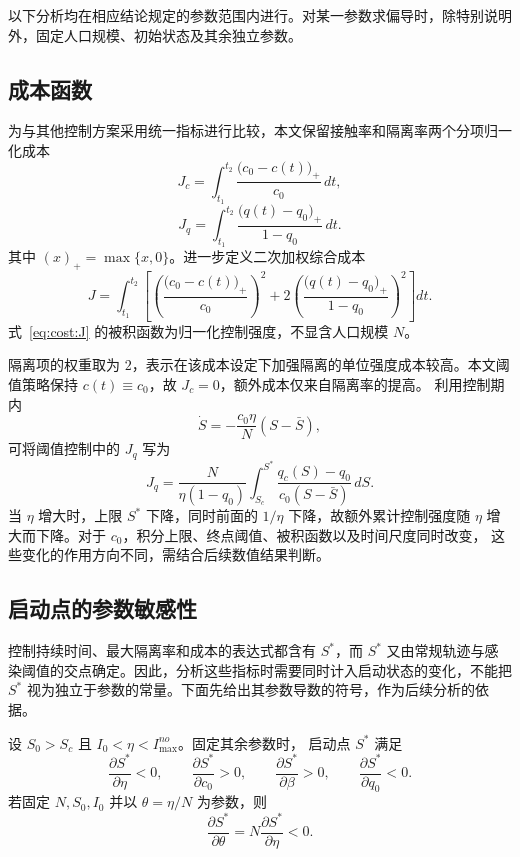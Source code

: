 \documentclass[lang=cn,a4paper,newtx]{elegantpaper}
\numberwithin{equation}{section}
\theoremstyle{plain}
\begin{document}
以下分析均在相应结论规定的参数范围内进行。对某一参数求偏导时，除特别说明外，固定人口规模、初始状态及其余独立参数。

\subsection{成本函数}

为与其他控制方案采用统一指标进行比较，本文保留接触率和隔离率两个分项归一化成本
\begin{equation}
J_c=\int_{t_1}^{t_2} \frac{\bigl(c_0-c(t)\bigr)_+}{c_0}\,dt,
\end{equation}
\begin{equation}
J_q=\int_{t_1}^{t_2} \frac{\bigl(q(t)-q_0\bigr)_+}{1-q_0}\,dt.
\end{equation}
其中 $(x)_+=\max\{x,0\}$。进一步定义二次加权综合成本
\begin{equation}
J
=
\int_{t_1}^{t_2}
\left[
\left(\frac{\bigl(c_0-c(t)\bigr)_+}{c_0}\right)^2
+
2\left(\frac{\bigl(q(t)-q_0\bigr)_+}{1-q_0}\right)^2
\right]dt.
\label{eq:cost:J}
\end{equation}
式~\eqref{eq:cost:J} 的被积函数为归一化控制强度，不显含人口规模 $N$。

隔离项的权重取为 $2$，表示在该成本设定下加强隔离的单位强度成本较高。本文阈值策略保持 $c(t)\equiv c_0$，故 $J_c=0$，额外成本仅来自隔离率的提高。
利用控制期内
\[
\dot S=-\frac{c_0\eta}{N}(S-\bar S),
\]
可将阈值控制中的 $J_q$ 写为
\begin{equation}
J_q
=
\frac{N}{\eta(1-q_0)}
\int_{S_c}^{S^*}
\frac{q_c(S)-q_0}{c_0(S-\bar S)}\,dS.
\end{equation}
当 $\eta$ 增大时，上限 $S^*$ 下降，同时前面的 $1/\eta$ 下降，故额外累计控制强度随
$\eta$ 增大而下降。对于 $c_0$，积分上限、终点阈值、被积函数以及时间尺度同时改变，
这些变化的作用方向不同，需结合后续数值结果判断。


\subsection{启动点的参数敏感性}
控制持续时间、最大隔离率和成本的表达式都含有 $S^*$，而 $S^*$ 又由常规轨迹与感染阈值的交点确定。因此，分析这些指标时需要同时计入启动状态的变化，不能把 $S^*$ 视为独立于参数的常量。下面先给出其参数导数的符号，作为后续分析的依据。

\begin{lemma}
\label{lem:s1:Sstar-sensitivity}
设 $S_0>S_c$ 且 $I_0<\eta<I_{\max}^{no}$。固定其余参数时，
启动点 $S^*$ 满足
\[
\frac{\partial S^*}{\partial \eta}<0,
\qquad
\frac{\partial S^*}{\partial c_0}>0,
\qquad
\frac{\partial S^*}{\partial \beta}>0,
\qquad
\frac{\partial S^*}{\partial q_0}<0.
\]
若固定 $N,S_0,I_0$ 并以 $\theta=\eta/N$ 为参数，则
\[
\frac{\partial S^*}{\partial \theta}=N\frac{\partial S^*}{\partial \eta}<0.
\]
\end{lemma}
\end{document}
